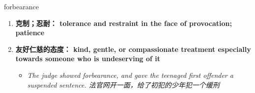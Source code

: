 
\begin{frame}
{\huge forbearance}
\begin{center}
\begin{enumerate}\Large
  \item \textbf{克制；忍耐： tolerance and restraint in the face of provocation; patience}
  \item \textbf{友好仁慈的态度： kind, gentle, or compassionate treatment especially towards someone who is undeserving of it}
  \begin{itemize}
    \item \em{\Large{The judge showed forbearance, and gave the teenaged first offender a suspended sentence. 法官网开一面，给了初犯的少年犯一个缓刑}}
  \end{itemize}
\end{enumerate}
\end{center}
\end{frame}
